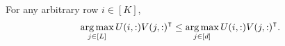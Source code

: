 \begin{lemma}
For any arbitrary row $i\in[K]$, 
\begin{align*}
\mathop{\rm arg\,max}_{j\in[L]} U(i,:){V(j,:)}^{\intercal} \leq \mathop{\rm arg\,max}_{j\in[d]} U(i,:){V(j,:)}^{\intercal} . 
\end{align*}
\end{lemma}
